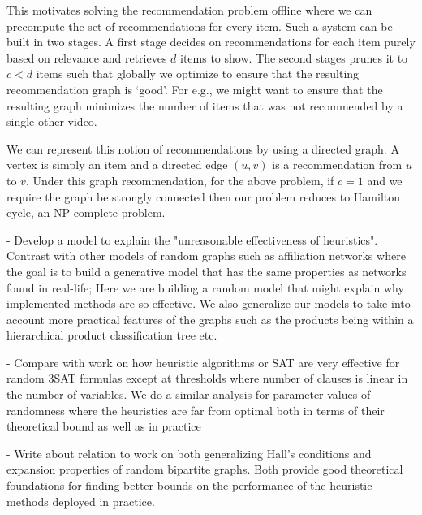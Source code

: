 This motivates solving the recommendation problem offline where we can
precompute the set of recommendations for every item. Such a system can be built
in two stages. A first stage decides on recommendations for each item purely
based on relevance and retrieves $d$ items to show. The second stages prunes it
to $c < d$ items such that globally we optimize to ensure that the resulting
recommendation graph is `good'. For e.g., we might want to ensure that the
resulting graph minimizes the number of items that was not recommended by a
single other video. \vs

We can represent this notion of recommendations by using a directed graph. A
vertex is simply an item and a directed edge $(u, v)$ is a recommendation from
$u$ to $v$. Under this graph recommendation, for the above problem, if $c=1$ and
we require the graph be strongly connected then our problem reduces to Hamilton
cycle, an NP-complete problem. \vs


- Develop a model to explain the "unreasonable effectiveness of heuristics". Contrast with other models of random graphs such as affiliation networks where the goal is to build a generative model that has the same properties as networks found in real-life; Here we are building a random model that might explain why implemented methods are so effective. We also generalize our models to take into account more practical features of the graphs such as the products being within a hierarchical product classification tree etc.

- Compare with work on how heuristic algorithms or SAT are very effective for random 3SAT formulas except at thresholds where number of clauses is linear in the number of variables. We do a similar analysis for parameter values of randomness where the heuristics are far from optimal both in terms of their theoretical bound as well as in practice

- Write about relation to work on both generalizing Hall's conditions and expansion properties of random bipartite graphs. Both provide good theoretical foundations for finding better bounds on the performance of the heuristic methods deployed in practice.

